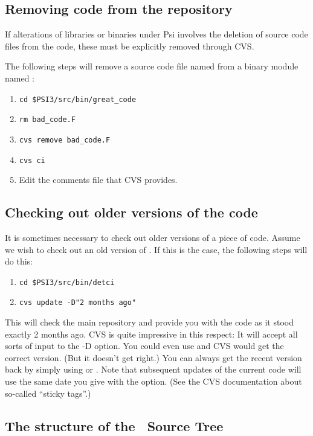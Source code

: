 \subsection{Removing code from the repository}
If alterations of libraries or binaries under Psi involves the deletion of 
source code files from the code, these must be explicitly removed through CVS.

The following steps will remove a source code file named  
from a binary module named :
\begin{enumerate}
\item {\tt cd \$PSI3/src/bin/great\_code}
\item {\tt rm bad\_code.F}
\item {\tt cvs remove bad\_code.F}
\item {\tt cvs ci}
\item Edit the comments file that CVS provides. 
\end{enumerate}

\subsection{Checking out older versions of the code}
It is sometimes necessary to check out older versions of a piece of code.
Assume we wish to check out an old version of \PSIdetci. If this
is the case, the following steps will do this:
\begin{enumerate}
\item {\tt cd \$PSI3/src/bin/detci}
\item {\tt cvs update -D"2 months ago"}
\end{enumerate}

This will check the main repository and provide you with the code as
it stood exactly 2 months ago. CVS is quite impressive in this respect:
It will accept all sorts of input to the -D option. You could even use
 and CVS would get the correct version. (But it
doesn't get  right.)  You can always get the
recent version back by simply using  or . Note
that subsequent updates of the current code will use the same date you
give with the  option.  (See the CVS documentation about so-called
``sticky tags''.)

\subsection{The structure of the \PSIthree\ Source Tree}
\label{psitree} 


